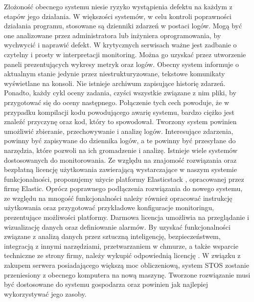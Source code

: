 \newline \indent Złożoność obecnego systemu niesie ryzyko wystąpienia defektu na każdym z etapów jego działania. W większości systemów, w celu kontroli poprawności działania programu, stosowane są dzienniki zdarzeń w postaci logów. Mogą być one analizowane przez administratora lub inżyniera oprogramowania, by wychwycić i naprawić defekt. W krytycznych serwisach ważne jest zadbanie o czytelny i prosty w interpretacji monitoring. Można go uzyskać przez utworzenie paneli prezentujących wykresy metryk oraz logów. Obecny system informuje o aktualnym stanie jedynie przez niestrukturyzowane, tekstowe komunikaty wyświetlane na konsoli. Nie istnieje archiwum zapisujące historię zdarzeń. Ponadto, każdy cykl oceny zadania, czyści wszystkie związane z nim pliki, by przygotować się do oceny następnego. Połączenie tych cech powoduje, że w przypadku kompilacji kodu powodującego awarię systemu, bardzo ciężko jest znaleźć przyczynę oraz kod, który to spowodował. Tworzony system powinien umożliwić zbieranie, przechowywanie i analizę logów. Interesujące zdarzenia, powinny być zapisywane do dziennika logów, a te powinny być przesyłane do narzędzia, które pozwoli na ich gromadzenie i analizę. Istnieje wiele systemów dostosowanych do monitorowania. Ze względu na znajomość rozwiązania oraz bezpłatną licencję użytkowania zawierającą wystarczające w naszym systemie funkcjonalności, proponujemy użycie platformy Elasticstack \cite{elastic}, opracowanej przez firmę Elastic. Oprócz poprawnego podłączenia rozwiązania do nowego systemu, ze względu na mnogość funkcjonalności należy również opracować instrukcję użytkowania oraz przygotować przykładowe konfiguracje monitoringu, prezentujące możliwości platformy. Darmowa licencja umożliwia na przeglądanie i wizualizację danych oraz definiowanie alarmów. By uzyskać funkcjonalności związane z analizą danych przez sztuczną inteligencję, bezpieczeństwem, integracją z innymi narzędziami, przetwarzaniem w chmurze, a także wsparcie techniczne ze strony firmy, należy wykupić odpowiednią licencję \cite{elasticLicencje}.
\newline \indent W związku z zakupem serwera posiadającego większą moc obliczeniową, system STOS zostanie przeniesiony z obecnego komputera na nową maszynę. Tworzone rozwiązanie musi być dostosowane do systemu gospodarza oraz powinien jak najlepiej wykorzystywać jego zasoby.
